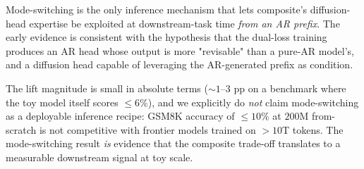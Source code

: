 Mode-switching is the only inference mechanism that lets composite's
diffusion-head expertise be exploited at downstream-task time
\emph{from an AR prefix}. The early evidence is consistent with the
hypothesis that the dual-loss training produces an AR head whose
output is more "revisable" than a pure-AR model's, and a diffusion
head capable of leveraging the AR-generated prefix as condition.

The lift magnitude is small in absolute terms ($\sim 1$--$3$ pp on a
benchmark where the toy model itself scores $\le 6\%$), and we
explicitly do \emph{not} claim mode-switching as a deployable
inference recipe: GSM8K accuracy of $\le 10\%$ at $200$M from-scratch
is not competitive with frontier models trained on $> 10$T tokens.
The mode-switching result \emph{is} evidence that the composite
trade-off translates to a measurable downstream signal at toy scale.
